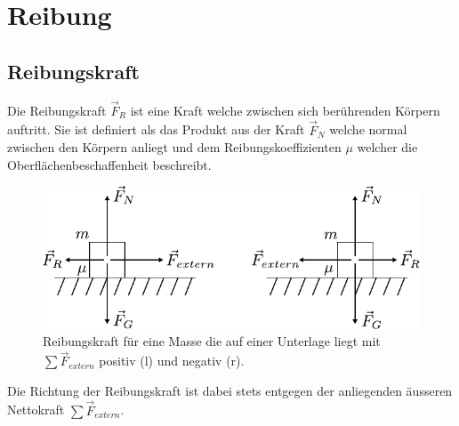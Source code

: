 



\chapter{Reibung}

\newpage

\section{Reibungskraft}
Die Reibungskraft $\vec{F}_R$ ist eine Kraft welche zwischen sich
berührenden Körpern auftritt. Sie ist definiert als das Produkt aus
der Kraft $\vec{F}_N$ welche normal zwischen den Körpern anliegt
und dem Reibungskoeffizienten $\mu$ welcher die 
Oberflächenbeschaffenheit beschreibt. 

\begin{figure}[h!]
	\centering
	\includegraphics[scale=0.8]{reibung.pdf}
	\caption{Reibungskraft für eine Masse die auf einer Unterlage 
		liegt mit $\sum \vec{F}_{extern}$ positiv (l)
		und negativ (r).}
\end{figure}

\noindent
Die Richtung der Reibungskraft ist dabei stets entgegen der 
anliegenden äusseren Nettokraft 
$\sum \vec{F}_{extern}$.


